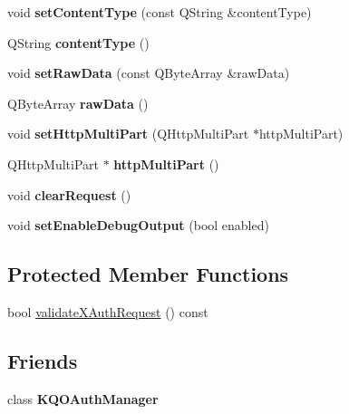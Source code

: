 \begin{DoxyCompactItemize}
\mbox{\label{class_k_q_o_auth_request_a766e6578c5be9930149232ccf8a6b5c4}} 
void {\bfseries set\+Content\+Type} (const Q\+String \&content\+Type)
\item 
\mbox{\label{class_k_q_o_auth_request_a87363b7b7284b40534088835fca8e04a}} 
Q\+String {\bfseries content\+Type} ()
\item 
\mbox{\label{class_k_q_o_auth_request_ad7ec22843c1ae0c5073937a6ac7482ea}} 
void {\bfseries set\+Raw\+Data} (const Q\+Byte\+Array \&raw\+Data)
\item 
\mbox{\label{class_k_q_o_auth_request_a6e4e2b5afa7f5add47dd8c8f68a4aac6}} 
Q\+Byte\+Array {\bfseries raw\+Data} ()
\item 
\mbox{\label{class_k_q_o_auth_request_ada2d68f230757c2a2d154654466ecb36}} 
void {\bfseries set\+Http\+Multi\+Part} (Q\+Http\+Multi\+Part $\ast$http\+Multi\+Part)
\item 
\mbox{\label{class_k_q_o_auth_request_a762e52bab083da54460d728e2156cba0}} 
Q\+Http\+Multi\+Part $\ast$ {\bfseries http\+Multi\+Part} ()
\item 
\mbox{\label{class_k_q_o_auth_request_ac343f86e4a7791254a8dd3100045ef6b}} 
void {\bfseries clear\+Request} ()
\item 
\mbox{\label{class_k_q_o_auth_request_a892718ee21613e0dee5e9cc33d487982}} 
void {\bfseries set\+Enable\+Debug\+Output} (bool enabled)
\end{DoxyCompactItemize}
\subsection*{Protected Member Functions}
\begin{DoxyCompactItemize}
\item 
bool \hyperlink{class_k_q_o_auth_request_ae9af8b8580c0cc551ad7085a92078cd2}{validate\+X\+Auth\+Request} () const
\end{DoxyCompactItemize}
\subsection*{Friends}
\begin{DoxyCompactItemize}
\item 
\mbox{\label{class_k_q_o_auth_request_aaea1c8b3d3ca4dfeff19e571576cacc4}} 
class {\bfseries K\+Q\+O\+Auth\+Manager}
\end{DoxyCompactItemize}


